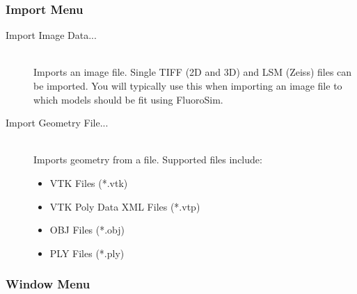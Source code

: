 \documentclass[11pt,titlepage,twoside]{article}
\begin{document}
\subsubsection{Import Menu}

\begin{description}

  \item[Import Image Data...] \hfill \\
  Imports an image file. Single TIFF (2D and 3D) and LSM (Zeiss) files can be imported. You will typically use this when importing an image file to which models should be fit using FluoroSim.
  
  \item[Import Geometry File...] \hfill \\
  Imports geometry from a file. Supported files include:
  
  \begin{itemize}
  \item VTK Files (*.vtk)
  \item VTK Poly Data XML Files (*.vtp)
  \item OBJ Files (*.obj)
  \item PLY Files (*.ply)
  \end{itemize}

\end{description}

\subsubsection{Window Menu}
\end{document}
